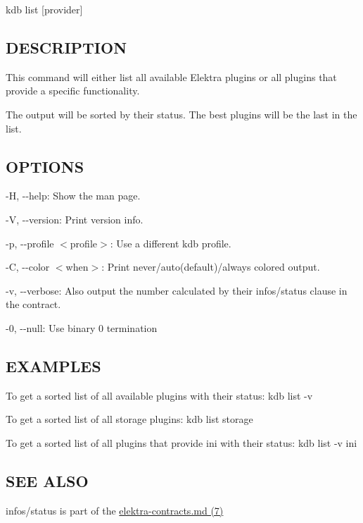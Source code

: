 {\ttfamily kdb list \mbox{[}provider\mbox{]}}

\subsection*{D\+E\+S\+C\+R\+I\+P\+T\+I\+ON}

This command will either list all available Elektra plugins or all plugins that provide a specific functionality.

The output will be sorted by their status. The best plugins will be the last in the list.

\subsection*{O\+P\+T\+I\+O\+NS}


\begin{DoxyItemize}
\item {\ttfamily -\/H}, {\ttfamily -\/-\/help}\+: Show the man page.
\item {\ttfamily -\/V}, {\ttfamily -\/-\/version}\+: Print version info.
\item {\ttfamily -\/p}, {\ttfamily -\/-\/profile $<$profile$>$}\+: Use a different kdb profile.
\item {\ttfamily -\/C}, {\ttfamily -\/-\/color $<$when$>$}\+: Print never/auto(default)/always colored output.
\item {\ttfamily -\/v}, {\ttfamily -\/-\/verbose}\+: Also output the number calculated by their {\ttfamily infos/status} clause in the contract.
\item {\ttfamily -\/0}, {\ttfamily -\/-\/null}\+: Use binary 0 termination
\end{DoxyItemize}

\subsection*{E\+X\+A\+M\+P\+L\+ES}

To get a sorted list of all available plugins with their status\+: {\ttfamily kdb list -\/v}

To get a sorted list of all storage plugins\+: {\ttfamily kdb list storage}

To get a sorted list of all plugins that provide {\ttfamily ini} with their status\+: {\ttfamily kdb list -\/v ini}

\subsection*{S\+EE A\+L\+SO}


\begin{DoxyItemize}
\item {\ttfamily infos/status} is part of the \hyperlink{md_doc_help_elektra-contracts_doc_help_elektra-contracts_md}{elektra-\/contracts.md (7)} 
\end{DoxyItemize}